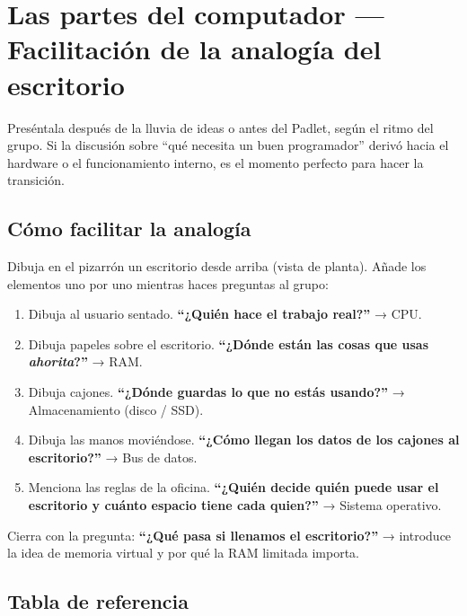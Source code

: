 \documentclass[12pt, oneside]{article}
\begin{document}
\section{Las partes del computador — Facilitación de la analogía del escritorio}

\begin{notaprofesor}
  Preséntala después de la lluvia de ideas o antes del Padlet, según el ritmo
  del grupo. Si la discusión sobre ``qué necesita un buen programador'' derivó
  hacia el hardware o el funcionamiento interno, es el momento perfecto para
  hacer la transición.
\end{notaprofesor}

\subsection{Cómo facilitar la analogía}

Dibuja en el pizarrón un escritorio desde arriba (vista de planta). Añade
los elementos uno por uno mientras haces preguntas al grupo:

\begin{enumerate}
  \item Dibuja al usuario sentado. \textbf{``¿Quién hace el trabajo real?''} → CPU.
  \item Dibuja papeles sobre el escritorio. \textbf{``¿Dónde están las cosas que
        usas \textit{ahorita}?''} → RAM.
  \item Dibuja cajones. \textbf{``¿Dónde guardas lo que no estás usando?''} →
        Almacenamiento (disco / SSD).
  \item Dibuja las manos moviéndose. \textbf{``¿Cómo llegan los datos de los cajones
        al escritorio?''} → Bus de datos.
  \item Menciona las reglas de la oficina. \textbf{``¿Quién decide quién puede usar
        el escritorio y cuánto espacio tiene cada quien?''} → Sistema operativo.
\end{enumerate}

Cierra con la pregunta: \textbf{``¿Qué pasa si llenamos el escritorio?''} →
introduce la idea de memoria virtual y por qué la RAM limitada importa.

\subsection{Tabla de referencia}
\end{document}
